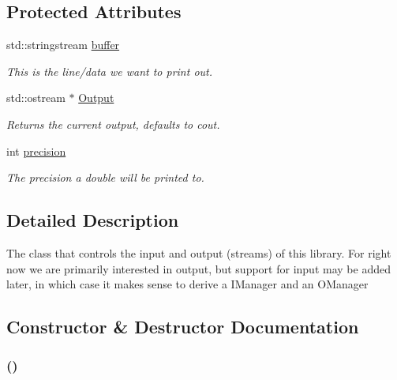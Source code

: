 \subsection*{Protected Attributes}
\begin{DoxyCompactItemize}
\item 
std::stringstream \hyperlink{classJKBuilder_1_1IOManager_adbf6a7492c6521b38c1510aebe307770}{buffer}
\begin{DoxyCompactList}\small\item\em This is the line/data we want to print out. \item\end{DoxyCompactList}\item 
std::ostream $\ast$ \hyperlink{classJKBuilder_1_1IOManager_aafe3b1218427d92a689d147f74e74f4b}{Output}
\begin{DoxyCompactList}\small\item\em Returns the current output, defaults to cout. \item\end{DoxyCompactList}\item 
int \hyperlink{classJKBuilder_1_1IOManager_aa95455ed52a8459fad69509a4a0411b5}{precision}
\begin{DoxyCompactList}\small\item\em The precision a double will be printed to. \item\end{DoxyCompactList}\end{DoxyCompactItemize}


\subsection{Detailed Description}
The class that controls the input and output (streams) of this library. For right now we are primarily interested in output, but support for input may be added later, in which case it makes sense to derive a IManager and an OManager 

\subsection{Constructor \& Destructor Documentation}
\hypertarget{classJKBuilder_1_1IOManager_afabc1befb314e6ce3d793ab1319295c5}{
\subsubsection[{IOManager}]{ ()}}
\label{classJKBuilder_1_1IOManager_afabc1befb314e6ce3d793ab1319295c5}


